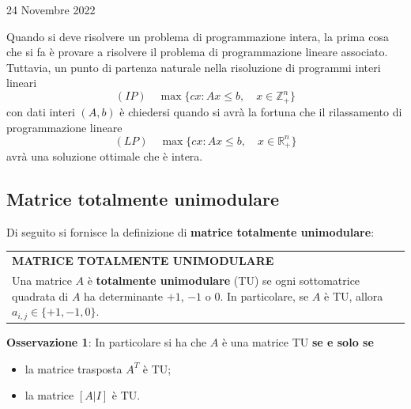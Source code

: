\documentclass[a4paper]{extarticle}
\renewcommand\arraystretch{}
\begin{document}
\newpage
\begin{center}
    24 Novembre 2022
\end{center}
Quando si deve risolvere un problema di programmazione intera, la prima cosa che si fa è provare a risolvere il problema di programmazione lineare associato.\\
Tuttavia, un punto di partenza naturale nella risoluzione di programmi interi lineari
\[(IP) \hspace{1em} \max\{cx : Ax \leq b, \hspace{1em} x \in \mathbb{Z}^n_+\}\]
con dati interi $(A,b)$ è chiedersi quando si avrà la fortuna che il rilassamento di programmazione lineare
\[(LP) \hspace{1em} \max\{cx : Ax \leq b, \hspace{1em} x \in \mathbb{R}^n_+\}\]
avrà una soluzione ottimale che è intera.

\vspace{1em}
\subsection{Matrice totalmente unimodulare}
Di seguito si fornisce la definizione di \textbf{matrice totalmente unimodulare}:

\vspace{1em}
\setlength{\tabcolsep}{14pt}
\renewcommand{\arraystretch}{2}
\noindent
\begin{tabularx}{\textwidth}{@{}|P|@{}}
    \hline
    {\textbf{MATRICE TOTALMENTE UNIMODULARE}}\\
    \parbox{\linewidth}{Una matrice $A$ è \textbf{totalmente unimodulare} (TU) se ogni sottomatrice quadrata di $A$ ha determinante $+1$, $-1$ o $0$.\\
    In particolare, se $A$ è TU, allora $a_{i,j} \in \{+1,-1,0\}$.
    \vspace{3mm}}\\
    \hline
\end{tabularx}

\vspace{2em}
\noindent
\textbf{Osservazione 1}: In particolare si ha che $A$ è una matrice TU \textbf{se e solo se}
\begin{itemize}
    \item la matrice trasposta $A^T$ è TU;
    \item la matrice $[A|I]$ è TU.
\end{itemize}
\end{document}

